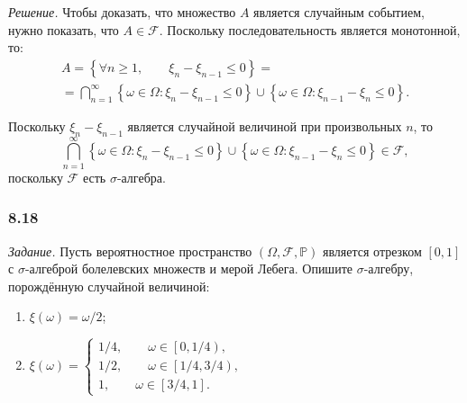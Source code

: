 \textit{Решение.} Чтобы доказать, что множество $A$ является случайным событием, нужно показать, что $A \in \mathcal{F} $.
Поскольку последовательность является монотонной, то:
\begin{equation*}
\begin{split}
A =
\left\{ \forall n \geq 1, \qquad \xi_n - \xi_{n-1} \leq 0 \right\} = \\
= \bigcap \limits_{n=1}^{ \infty } \left\{ \omega \in \Omega: \xi_n - \xi_{n-1} \leq 0 \right\} \cup \left\{ \omega \in \Omega: \xi_{n-1} - \xi_n \leq 0 \right\}.
\end{split}
\end{equation*}

Поскольку $ \xi_n - \xi_{n-1} $ является случайной величиной при произвольных $n$, то
$$ \bigcap \limits_{n=1}^{ \infty } \left\{ \omega \in \Omega: \xi_n - \xi_{n-1} \leq 0 \right\} \cup
\left\{ \omega \in \Omega: \xi_{n-1} - \xi_n \leq 0 \right\} \in \mathcal{F},$$
поскольку $ \mathcal{F} $ есть $ \sigma $-алгебра.

\subsubsection*{8.18}

\textit{Задание.}
Пусть вероятностное пространство
$ \left( \Omega, \mathcal{F}, \mathbb{P} \right) $
является отрезком $ \left[ 0, 1 \right] $ с $ \sigma $-алгеброй болелевских множеств и мерой Лебега.
Опишите $ \sigma $-алгебру, порождённую случайной величиной:
\begin{enumerate}[label=\alph*)]
\item $ \xi \left( \omega \right) = \omega/2 $;
\item $ \xi \left( \omega \right) =
\begin{cases}
1/4, \qquad \omega \in \left[ 0, 1/4 \right), \\
1/2, \qquad \omega \in \left[ 1/4, 3/4 \right), \\
1, \qquad \omega \in \left[ 3/4, 1 \right].
\end{cases}$
\end{enumerate}

